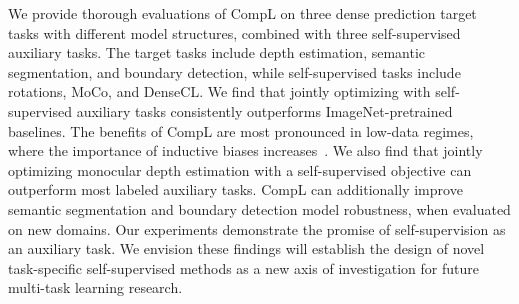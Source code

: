 \documentclass[10pt,twocolumn,letterpaper]{article}
\begin{document}
We provide thorough evaluations of CompL on three dense prediction target tasks with different model structures, combined with three self-supervised auxiliary tasks. 
The target tasks include depth estimation, semantic segmentation, and boundary detection, while self-supervised tasks include rotations, MoCo, and DenseCL.
We find that jointly optimizing with self-supervised auxiliary tasks consistently outperforms ImageNet-pretrained baselines.
The benefits of CompL are most pronounced in low-data regimes, where the importance of inductive biases increases~\cite{baxter2000model}. 
We also find that jointly optimizing monocular depth estimation with a self-supervised objective can outperform most labeled auxiliary tasks.
CompL can additionally improve semantic segmentation and boundary detection model robustness, when evaluated on new domains.
Our experiments demonstrate the promise of self-supervision as an auxiliary task. 
We envision these findings will establish the design of novel task-specific self-supervised methods as a new axis of investigation for future multi-task learning research.
\end{document}
